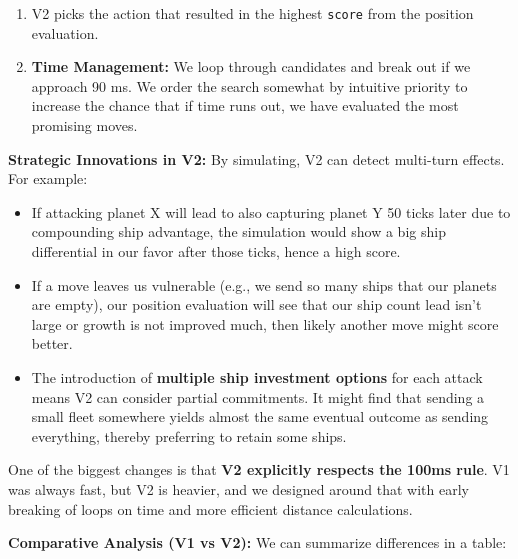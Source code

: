 \documentclass[conference]{IEEEtran}
\begin{document}
\begin{enumerate}
Essentially, \texttt{evaluatePosition} returns something like: \texttt{(myShips - oppShips) + 10*(myGrowth -\linebreak oppGrowth) + minor\_position\_terms}.

\item V2 picks the action that resulted in the highest \texttt{score} from the position evaluation.

\item \textbf{Time Management:} We loop through candidates and break out if we approach 90 ms. We order the search somewhat by intuitive priority to increase the chance that if time runs out, we have evaluated the most promising moves.
\end{enumerate}

\textbf{Strategic Innovations in V2:} By simulating, V2 can detect multi-turn effects. For example:

\begin{itemize}
\item If attacking planet X will lead to also capturing planet Y 50 ticks later due to compounding ship advantage, the simulation would show a big ship differential in our favor after those ticks, hence a high score.

\item If a move leaves us vulnerable (e.g., we send so many ships that our planets are empty), our position evaluation will see that our ship count lead isn't large or growth is not improved much, then likely another move might score better.

\item The introduction of \textbf{multiple ship investment options} for each attack means V2 can consider partial commitments. It might find that sending a small fleet somewhere yields almost the same eventual outcome as sending everything, thereby preferring to retain some ships.
\end{itemize}

One of the biggest changes is that \textbf{V2 explicitly respects the 100ms rule}. V1 was always fast, but V2 is heavier, and we designed around that with early breaking of loops on time and more efficient distance calculations.

\textbf{Comparative Analysis (V1 vs V2):} We can summarize differences in a table:
\end{document}
